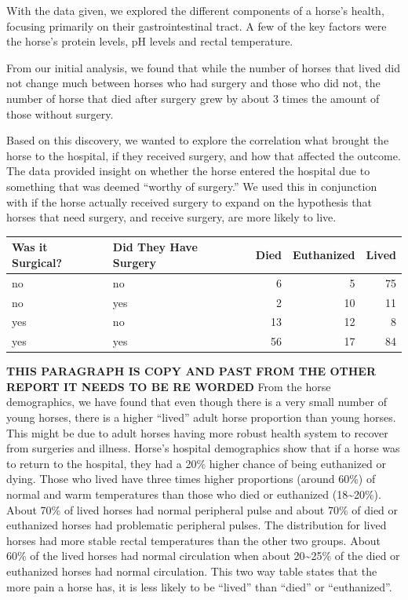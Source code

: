 \documentclass[12pt,]{article}
\begin{document}
With the data given, we explored the different components of a horse's
health, focusing primarily on their gastrointestinal tract. A few of the
key factors were the horse's protein levels, pH levels and rectal
temperature.

From our initial analysis, we found that while the number of horses that
lived did not change much between horses who had surgery and those who
did not, the number of horse that died after surgery grew by about 3
times the amount of those without surgery.

Based on this discovery, we wanted to explore the correlation what
brought the horse to the hospital, if they received surgery, and how
that affected the outcome. The data provided insight on whether the
horse entered the hospital due to something that was deemed ``worthy of
surgery.'' We used this in conjunction with if the horse actually
received surgery to expand on the hypothesis that horses that need
surgery, and receive surgery, are more likely to live.

\begin{longtable}[]{@{}llrrr@{}}
\toprule
Was it Surgical? & Did They Have Surgery & Died & Euthanized &
Lived\tabularnewline
\midrule
\endhead
no & no & 6 & 5 & 75\tabularnewline
no & yes & 2 & 10 & 11\tabularnewline
yes & no & 13 & 12 & 8\tabularnewline
yes & yes & 56 & 17 & 84\tabularnewline
\bottomrule
\end{longtable}

\textbf{THIS PARAGRAPH IS COPY AND PAST FROM THE OTHER REPORT IT NEEDS
TO BE RE WORDED} From the horse demographics, we have found that even
though there is a very small number of young horses, there is a higher
``lived'' adult horse proportion than young horses. This might be due to
adult horses having more robust health system to recover from surgeries
and illness. Horse's hospital demographics show that if a horse was to
return to the hospital, they had a 20\% higher chance of being
euthanized or dying. Those who lived have three times higher proportions
(around 60\%) of normal and warm temperatures than those who died or
euthanized (18\textasciitilde{}20\%). About 70\% of lived horses had
normal peripheral pulse and about 70\% of died or euthanized horses had
problematic peripheral pulses. The distribution for lived horses had
more stable rectal temperatures than the other two groups. About 60\% of
the lived horses had normal circulation when about
20\textasciitilde{}25\% of the died or euthanized horses had normal
circulation. This two way table states that the more pain a horse has,
it is less likely to be ``lived'' than ``died'' or ``euthanized''.
\end{document}
